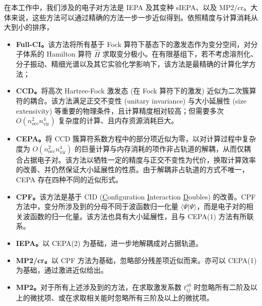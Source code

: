 在本工作中，我们涉及的电子对方法是 IEPA 及其变种 sIEPA、以及 MP2/cr。大体来说，这些方法可以通过精确的方法一步一步近似得到。依照精度与计算消耗从大到小的排序，
\begin{itemize}[nosep]
  \item \textbf{Full-CI。}该方法将所有基于 Fock 算符下基态下的激发态作为变分空间，对分子体系的 Hamilton 算符 $\hat H$ 求取变分极小。在有限基组下，若不考虑溶剂化、分子振动、精细光谱以及其它实验化学影响下，该方法是最精确的计算化学方法；
  \item \textbf{CCD}\cite{Coester-Coester.NPB.1958, Coester-Kuemmel.NPB.1960, Cizek-Cizek.JCP.1966, Cizek-Paldus.IJQC.1971}\textbf{。}将高次 Hartree-Fock 激发态 (在 Fock 算符下的激发) 近似为二次簇算符的耦合。该方法满足正交不变性 (unitary invariance) 与大小延展性 (size extensivity) 等重要的物理条件，且计算精度相对较高；但需要多次 $O(n_\mathrm{occ}^2 n_\mathrm{vir}^4)$ 复杂度的计算、且内存资源消耗巨大。
  \item \textbf{CEPA}\cite{Ahlrichs-Ahlrichs.CPC.1979}\textbf{。}将 CCD 簇算符系数方程中的部分项近似为零，以对计算过程中复杂度为 $O(n_\mathrm{occ}^2 n_\mathrm{vir}^4)$ 的巨量计算与内存消耗的项作非占轨道的解耦，从而仅耦合占据电子对。该方法以牺牲一定的精度与正交不变性为代价，换取计算效率的改善、并仍然保证大小延展性的性质。由于解耦非占轨道的方式不唯一，CEPA 存在四种不同的近似形式。
  \item \textbf{CPF}\cite{Ahlrichs-Ehrhardt.JCP.1985}\textbf{。}该方法是基于 CID (\underline{C}onfiguration \underline{I}nteraction \underline{D}oubles) 的改善。CPF 方法中，变分所涉及到的分母不同于波函数归一化量 $\langle \Psi | \Psi \rangle$，而是电子对的相关波函数的归一化量。该方法也具有大小延展性，且与 CEPA(1) 方法有所联系。
  \item \textbf{IEPA}\cite{Sinanoǧlu-Sinanoǧlu.ACP.1964, Nesbet-Nesbet.ACP.1965}\textbf{。}以 CEPA(2) 为基础，进一步地解耦成对占据轨道。
  \item \textbf{MP2/cr}\cite{Dykstra-Davidson.IJQC.2000}\textbf{。}以 CPF 方法为基础，忽略部分残差项近似而来。亦可以 CEPA(1) 为基础，通过激进近似给出。
  \item \textbf{MP2}\cite{Moeller-Plesset.PR.1934}\textbf{。}对于所有上述涉及到的方法，在求取激发系数 $t_{ij}^{ab}$ 时忽略所有二阶及以上的微扰项、或在求取相关能时忽略所有三阶及以上的微扰项。
\end{itemize}

